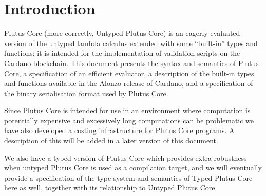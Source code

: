 \section{Introduction}
\label{sec:introduction}
Plutus Core (more correctly, Untyped Plutus Core) is an eagerly-evaluated
version of the untyped lambda calculus extended with some ``built-in'' types and
functions; it is intended for the implementation of validation scripts on the
Cardano blockchain.  This document presents the syntax and semantics of Plutus
Core, a specification of an efficient evaluator, a description of the built-in
types and functions available in the Alonzo release of Cardano, and a
specification of the binary serialisation format used by Plutus Core.

Since Plutus Core is intended for use in an environment where
computation is potentially expensive and excessively long computations can be
problematic we have also developed a costing infrastructure for Plutus Core
programs. A description of this will be added in a later version of this
document.

We also have a typed version of Plutus Core which provides extra robustness when
untyped Plutus Core is used as a compilation target, and we will eventually
provide a specification of the type system and semantics of Typed Plutus Core
here as well, together with its relationship to Untyped Plutus Core.
